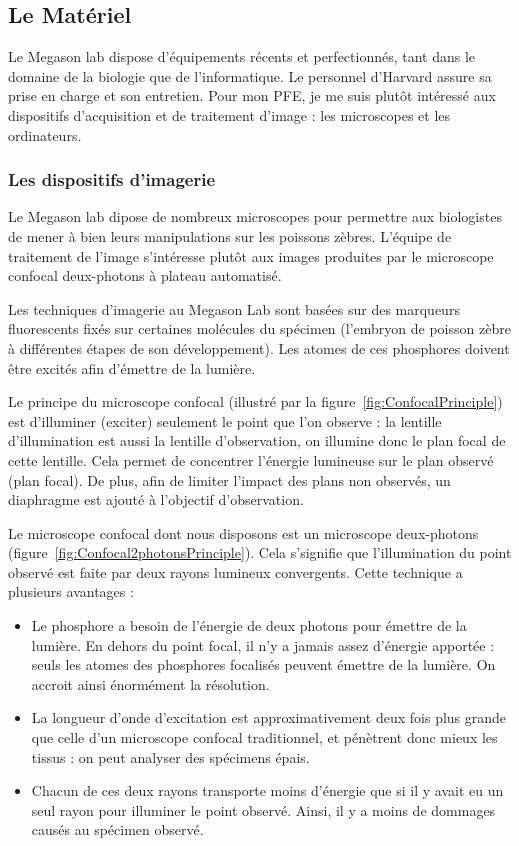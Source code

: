 \subsection{Le Matériel} 
Le Megason lab dispose d'équipements récents et perfectionnés, tant dans le domaine de la biologie que de l'informatique. Le personnel d'Harvard assure sa prise en charge et son entretien.
Pour mon PFE, je me suis plutôt intéressé aux dispositifs d'acquisition et de traitement d'image : les microscopes et les ordinateurs.

\subsubsection{Les dispositifs d'imagerie}


Le Megason lab dipose de nombreux microscopes pour permettre aux biologistes de mener à bien leurs manipulations sur les poissons zèbres.
L'équipe de traitement de l'image s'intéresse plutôt aux images produites par le microscope confocal deux-photons à plateau automatisé. 

Les techniques d'imagerie au Megason Lab sont basées sur des marqueurs fluorescents fixés sur certaines molécules du spécimen (l'embryon de poisson zèbre à différentes étapes de son développement). Les atomes de ces phosphores doivent être excités afin d'émettre de la lumière.


Le principe du microscope confocal (illustré par la figure~\ref{fig:ConfocalPrinciple}) est d'illuminer (exciter) seulement le point que l'on observe : la lentille d'illumination est aussi la lentille d'observation, on illumine donc le plan focal de cette lentille. Cela permet de concentrer l'énergie lumineuse sur le plan observé (plan focal). De plus, afin de limiter l'impact des plans non observés, un diaphragme est ajouté à l'objectif d'observation.

Le microscope confocal dont nous disposons est un microscope deux-photons (figure~\ref{fig:Confocal2photonsPrinciple}).
Cela s'signifie que l'illumination du point observé est faite par deux rayons lumineux convergents.
Cette technique a plusieurs avantages :
\begin{itemize}
  \item Le phosphore a besoin de l'énergie de deux photons pour émettre de la lumière. En dehors du point focal, il n'y a jamais assez d'énergie apportée : seuls les atomes des phosphores focalisés peuvent émettre de la lumière. On accroit ainsi énormément la résolution.
  \item La longueur d'onde d'excitation est approximativement deux fois plus grande que celle d'un microscope confocal traditionnel, et pénètrent donc mieux les tissus : on peut analyser des spécimens épais.
  \item Chacun de ces deux rayons transporte moins d'énergie que si il y avait eu un seul rayon pour illuminer le point observé.
  Ainsi, il y a moins de dommages causés au spécimen observé.
\end{itemize}

